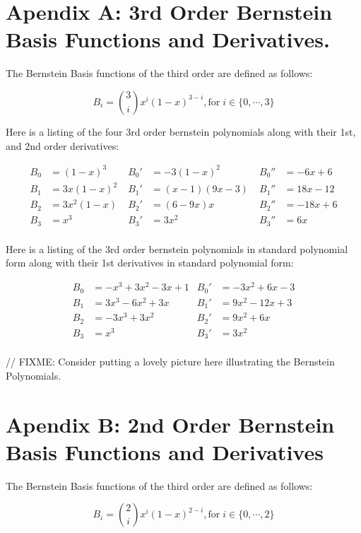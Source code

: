\documentclass[12pt, letterpaper]{article}
\begin{document}
\newpage

\section{Apendix A: 3rd Order Bernstein Basis Functions and Derivatives.}

The Bernstein Basis functions of the third order are defined as follows:

$$B_{i} = \binom {3}{i} x^{i}(1 - x)^{3 - i}, \text{for} \; i \in \{0, \cdots, 3\}$$

Here is a listing of the four 3rd order bernstein polynomials along with their 1st, and 2nd order derivatives:

\begin{align*}
B_{0} &= (1 - x)^{3} \; & B_{0}' &= -3(1-x)^{2} \; & B_{0}'' &= - 6x + 6\\
B_{1} &= 3x(1 - x)^{2} \; & B_{1}' &= (x - 1)(9x - 3) \; & B_{1}'' &= 18 x - 12\\
B_{2} &= 3x^{2}(1 - x) \; & B_{2}' &= (6 - 9x)x \; & B_{2}'' &= -18x + 6 \\
B_{3} &= x^{3} \; & B_{3}' &= 3x^{2} \; & B_{3}'' &= 6x\\
\end{align*}

Here is a listing of the 3rd order bernstein polynomials in standard polynomial form along with their 1st derivatives in standard polynomial form:

\begin{align*}
B_{0} &= -x^{3} + 3x^{2} - 3x + 1 &B_{0}' &= -3x^{2} + 6x - 3\\
B_{1} &= 3x^{3} - 6x^{2} + 3x      &B_{1}' &= 9x^{2} - 12x + 3\\
B_{2} &= -3x^{3} + 3x^{2} &B_{2}' &= 9x^{2} + 6x\\
B_{3} &= x^{3} &B_{3}' &= 3x^{2}\\
\end{align*}

// FIXME: Consider putting a lovely picture here illustrating the Bernstein Polynomials.

\newpage

\section{Apendix B: 2nd Order Bernstein Basis Functions and Derivatives}

The Bernstein Basis functions of the third order are defined as follows:

$$B_{i} = \binom {2}{i} x^{i}(1 - x)^{2 - i}, \text{for} \; i \in \{0, \cdots, 2\}$$
\end{document}
